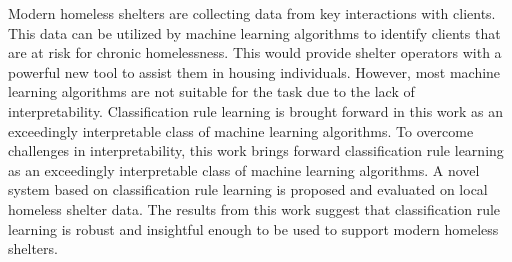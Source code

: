 \documentclass{ucalgarythesis}
\theoremstyle{plain}
\theoremstyle{definition}
\begin{document}

  \begin{thesisabstract}  
    Modern homeless shelters are collecting data from key interactions with clients. This data can be utilized by machine learning algorithms to identify clients that are at risk for chronic homelessness. This would provide shelter operators with a powerful new tool to assist them in housing individuals. However, most machine learning algorithms are not suitable for the task due to the lack of interpretability. Classification rule learning is brought forward in this work as an exceedingly interpretable class of machine learning algorithms.
To overcome challenges in interpretability, this work brings forward classification rule learning as an exceedingly interpretable class of machine learning algorithms. A novel system based on classification rule learning is proposed and evaluated on local homeless shelter data. The results from this work suggest that classification rule learning is robust and insightful enough to be used to support modern homeless shelters.
  \end{thesisabstract}




% 
 
   
 
\end{document}

